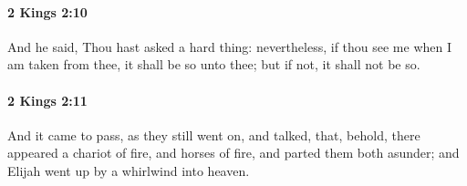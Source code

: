		\paragraph{2 Kings 2:10} %
			\label{2KINGS-2-10}

			And he said, Thou hast asked a hard thing: nevertheless, if thou see me when I am taken from thee, it shall be so unto thee; but if not, it shall not be so.


		\paragraph{2 Kings 2:11} %
			\label{2KINGS-2-11}

			And it came to pass, as they still went on, and talked, that, behold, there appeared a chariot of fire, and horses of fire, and parted them both asunder; and Elijah went up by a whirlwind into heaven.


